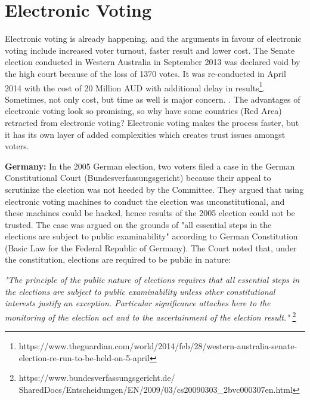  

   
\section{Electronic Voting}
  Electronic voting is already happening, and the
  arguments in favour of electronic voting 
  include increased voter turnout, faster result and lower cost. The Senate 
  election conducted in Western Australia in September 2013 was 
  declared void by the high court because of the loss of 1370 votes. It was 
  re-conducted in April 2014 with the cost of 20 Million 
  AUD with additional  delay in results\footnote{https://www.theguardian.com/world/2014/feb/28/western-australia-senate-election-re-run-to-be-held-on-5-april}. Sometimes, 
  not only cost, but time as well is major concern.
  . 
  The advantages of electronic voting 
  look so promising, so why have some countries (Red Area) retracted 
  from electronic voting? Electronic voting makes 
  the process faster, but it has its own layer of added complexities 
  which creates trust issues amongst voters. 
  
  \textbf{Germany:} In the 2005 German election, two voters filed a case in the German 
  Constitutional Court (Bundesverfassungsgericht) because their 
  appeal to scrutinize the election 
  was not heeded by the Committee. They argued that using electronic 
  voting machines to conduct the election was unconstitutional, and 
  these machines could be hacked, hence results of the 2005 election 
  could not be trusted. The case was argued on the grounds 
  of "all essential steps in the elections are subject to 
  public examinability" according to German Constitution 
  (Basic Law for the Federal Republic of Germany). 
  The Court noted that, under the constitution, elections are 
  required to be public in nature:
  
  \textit{"The principle of the public nature of elections requires that all 
  essential steps in the elections are subject to public examinability
  unless other constitutional interests justify an exception. 
  Particular significance attaches here to the monitoring of the 
  election act and to the ascertainment of the election result."}
  \footnote{https://www.bundesverfassungsgericht.de/
  SharedDocs/Entscheidungen/EN/2009/03/cs20090303\_2bvc000307en.html}
 
